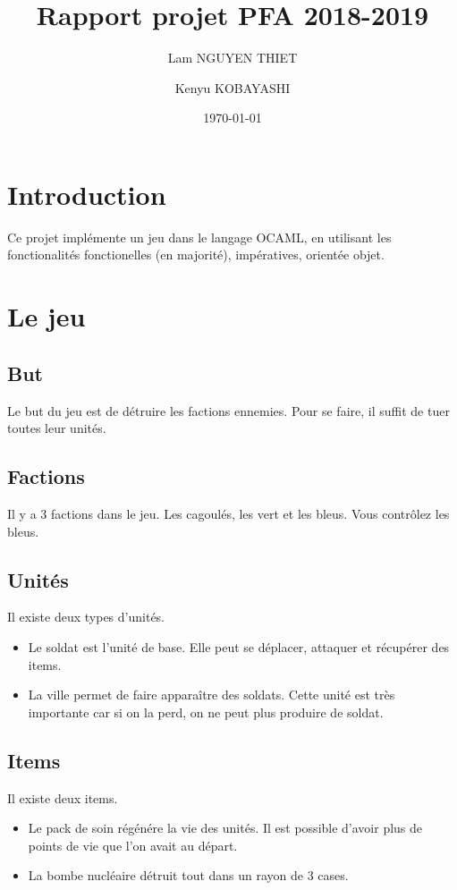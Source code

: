 \documentclass{article}
\title{Rapport projet PFA 2018-2019}
\date{\today}
\author{Lam NGUYEN THIET
\and Kenyu KOBAYASHI}
\begin{document}
\maketitle
\tableofcontents
\newpage
\section{Introduction}
Ce projet implémente un jeu dans le langage OCAML, en utilisant les fonctionalités fonctionelles (en majorité), impératives, orientée objet.

\section{Le jeu}
\subsection{But}
Le but du jeu est de détruire les factions ennemies. Pour se faire, il suffit de tuer toutes leur unités.

\subsection{Factions}
Il y a 3 factions dans le jeu. Les cagoulés, les vert et les bleus. Vous contrôlez les bleus.

\subsection{Unités}
Il existe deux types d'unités.

\begin{itemize}
    \item Le soldat est l'unité de base. Elle peut se déplacer, attaquer et récupérer des items.
    \item La ville permet de faire apparaître des soldats. Cette unité est très importante car si on la perd, on ne peut plus produire de soldat.
\end{itemize}

\subsection{Items}
Il existe deux items.

\begin{itemize}
    \item Le pack de soin régénére la vie des unités. Il est possible d'avoir plus de points de vie que l'on avait au départ.
    \item La bombe nucléaire détruit tout dans un rayon de 3 cases.
\end{itemize}
\end{document}
